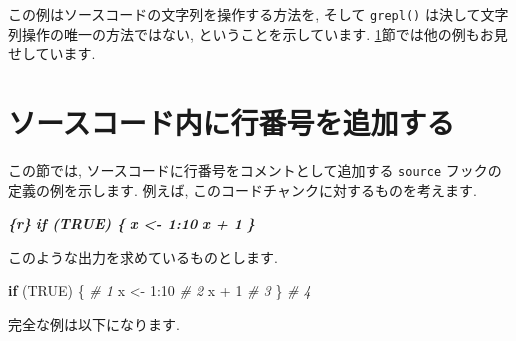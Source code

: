 \documentclass[
  11pt,
  lualatex,ja=standard,jafont=noto]{bxjsreport}
\newenvironment{Shaded}{\begin{snugshade}}{\end{snugshade}}
\newcommand{\CommentTok}[1]{\textcolor[rgb]{0.56,0.35,0.01}{\textit{#1}}}
\newcommand{\ConstantTok}[1]{\textcolor[rgb]{0.00,0.00,0.00}{#1}}
\newcommand{\ControlFlowTok}[1]{\textcolor[rgb]{0.13,0.29,0.53}{\textbf{#1}}}
\newcommand{\DecValTok}[1]{\textcolor[rgb]{0.00,0.00,0.81}{#1}}
\newcommand{\InformationTok}[1]{\textcolor[rgb]{0.56,0.35,0.01}{\textbf{\textit{#1}}}}
\newcommand{\NormalTok}[1]{#1}
\newcommand{\OtherTok}[1]{\textcolor[rgb]{0.56,0.35,0.01}{#1}}
\newcommand{\SpecialCharTok}[1]{\textcolor[rgb]{0.00,0.00,0.00}{#1}}
\begin{document}
この例はソースコードの文字列を操作する方法を, そして \texttt{grepl()} は決して文字列操作の唯一の方法ではない, ということを示しています. \ref{hook-number}節では他の例もお見せしています.

\hypertarget{hook-number}{%
\section{ソースコード内に行番号を追加する}\label{hook-number}}

この節では, ソースコードに行番号をコメントとして追加する \texttt{source} フックの定義の例を示します. 例えば, このコードチャンクに対するものを考えます.

\begin{Shaded}
\begin{Highlighting}[]
\InformationTok{\textasciigrave{}\textasciigrave{}\textasciigrave{}\{r\}}
\InformationTok{if (TRUE) \{}
\InformationTok{  x \textless{}{-} 1:10}
\InformationTok{  x + 1}
\InformationTok{\}}
\InformationTok{\textasciigrave{}\textasciigrave{}\textasciigrave{}}
\end{Highlighting}
\end{Shaded}

このような出力を求めているものとします.

\begin{Shaded}
\begin{Highlighting}[numbers=left,,]
\ControlFlowTok{if}\NormalTok{ (}\ConstantTok{TRUE}\NormalTok{) \{    }\CommentTok{\# 1}
\NormalTok{  x }\OtherTok{\textless{}{-}} \DecValTok{1}\SpecialCharTok{:}\DecValTok{10}    \CommentTok{\# 2}
\NormalTok{  x }\SpecialCharTok{+} \DecValTok{1}        \CommentTok{\# 3}
\NormalTok{\}              }\CommentTok{\# 4}
\end{Highlighting}
\end{Shaded}

完全な例は以下になります.
\end{document}
